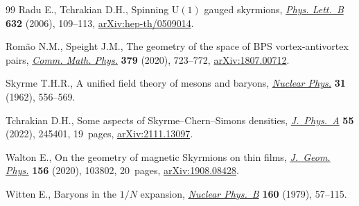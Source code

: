 \begin{thebibliography}{99}
Radu E., Tchrakian D.H., Spinning $\mathrm{U}(1)$ gauged skyrmions,
 \href{https://doi.org/10.1016/j.physletb.2005.10.020}{\textit{Phys. Lett.~B}} \textbf{632} (2006), 109--113,
 \href{https://arxiv.org/abs/hep-th/0509014}{arXiv:hep-th/0509014}.

Rom\~ao N.M., Speight J.M., The geometry of the space of {BPS}
 vortex-antivortex pairs, \href{https://doi.org/10.1007/s00220-020-03824-y}{\textit{Comm. Math. Phys.}} \textbf{379} (2020),
 723--772, \href{https://arxiv.org/abs/1807.00712}{arXiv:1807.00712}.

Skyrme T.H.R., A unified field theory of mesons and baryons, \href{https://doi.org/10.1016/0029-5582(62)90775-7}{\textit{Nuclear
 Phys.}} \textbf{31} (1962), 556--569.

Tchrakian D.H., Some aspects of {S}kyrme--{C}hern--{S}imons densities,
 \href{https://doi.org/10.1088/1751-8121/ac68b3}{\textit{J.~Phys.~A}} \textbf{55} (2022), 245401, 19~pages,
 \href{https://arxiv.org/abs/2111.13097}{arXiv:2111.13097}.

Walton E., On the geometry of magnetic {S}kyrmions on thin films,
 \href{https://doi.org/10.1016/j.geomphys.2020.103802}{\textit{J.~Geom. Phys.}} \textbf{156} (2020), 103802, 20~pages,
 \href{https://arxiv.org/abs/1908.08428}{arXiv:1908.08428}.

Witten E., Baryons in the $1/N$ expansion, \href{https://doi.org/10.1016/0550-3213(79)90232-3}{\textit{Nuclear Phys.~B}}
 \textbf{160} (1979), 57--115.

\end{thebibliography}
